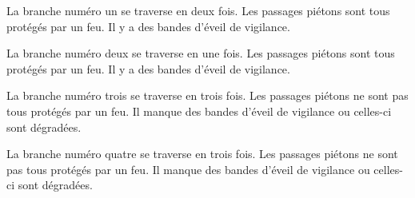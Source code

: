 \begin{appendix}
\newpar{}

La branche numéro un se traverse en deux fois.  Les passages piétons sont tous protégés par un feu. Il y a des bandes d'éveil de vigilance.

\newpar{}

La branche numéro deux se traverse en une fois. Les passages piétons sont tous protégés par un feu. Il y a des bandes d'éveil de vigilance.

\newpar{}

La branche numéro trois se traverse en trois fois. Les passages piétons ne sont pas tous protégés par un feu. Il manque des bandes d'éveil de vigilance ou celles-ci sont dégradées.

\newpar{}

La branche numéro quatre se traverse en trois fois. Les passages piétons ne sont pas tous protégés par un feu. Il manque des bandes d'éveil de vigilance ou celles-ci sont dégradées.

\newpar{}


\end{appendix}
